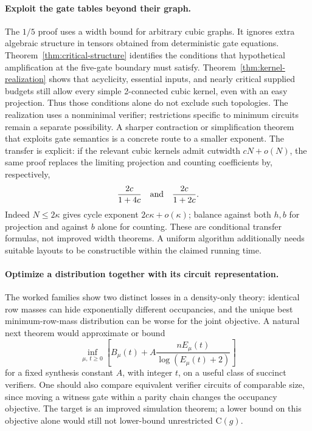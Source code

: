 \documentclass[11pt]{article}
\theoremstyle{definition}
\theoremstyle{remark}
\newcommand{\C}{\mathrm{C}}
\begin{document}
\paragraph{Exploit the gate tables beyond their graph.}
The $1/5$ proof uses a width bound for arbitrary cubic graphs. It
ignores extra algebraic structure in tensors obtained from deterministic
gate equations. Theorem~\ref{thm:critical-structure} identifies the
conditions that hypothetical amplification at the five-gate boundary
must satisfy. Theorem~\ref{thm:kernel-realization} shows that acyclicity,
essential inputs, and nearly critical supplied budgets still allow
every simple 2-connected cubic kernel, even with an easy projection.
Thus those conditions alone do not exclude such topologies. The
realization uses a nonminimal verifier; restrictions specific to
minimum circuits remain a separate possibility.
A sharper contraction or simplification theorem that exploits gate
semantics is a concrete route to a smaller exponent. The transfer
is explicit: if the relevant cubic kernels admit cutwidth
$cN+o(N)$, the same proof replaces the limiting projection and counting
coefficients by, respectively,
\[
 \frac{2c}{1+4c}
 \quad\hbox{and}\quad
 \frac{2c}{1+2c}.
\]
Indeed $N\le2\kappa$ gives cycle exponent $2c\kappa+o(\kappa)$;
balance against both $h,b$ for projection and against $b$ alone for
counting. These are conditional transfer formulas, not improved width
theorems. A uniform algorithm additionally needs suitable layouts to
be constructible within the claimed running time.

\paragraph{Optimize a distribution together with its circuit representation.}
The worked families show two distinct losses in a density-only theory:
identical row masses can hide exponentially different occupancies, and
the unique best minimum-row-mass distribution can be worse for the
joint objective. A natural next theorem would approximate or bound
\[
 \inf_{\mu,\,t\ge0}
 \left[B_\mu(t)+A\frac{nE_\mu(t)}{\log(E_\mu(t)+2)}\right]
\]
for a fixed synthesis constant $A$, with integer $t$, on a useful
class of succinct verifiers. One should also compare equivalent
verifier circuits of comparable size, since moving a witness gate
within a parity chain changes the occupancy objective. The target is
an improved simulation theorem; a lower bound on this objective alone
would still not lower-bound unrestricted $\C(g)$.
\end{document}
